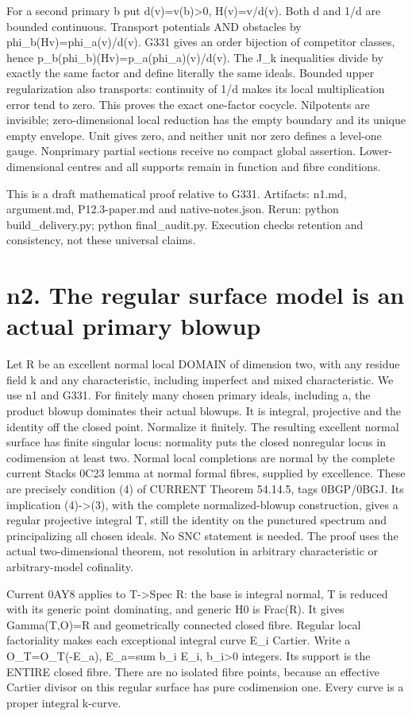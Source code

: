 \documentclass[11pt]{article}
\begin{document}
For a second primary b put d(v)=v(b)>0, H(v)=v/d(v). Both d and 1/d are bounded continuous. Transport potentials AND obstacles by phi\_b(Hv)=phi\_a(v)/d(v). G331 gives an order bijection of competitor classes, hence p\_b(phi\_b)(Hv)=p\_a(phi\_a)(v)/d(v). The J\_k inequalities divide by exactly the same factor and define literally the same ideals. Bounded upper regularization also transports: continuity of 1/d makes its local multiplication error tend to zero. This proves the exact one-factor cocycle. Nilpotents are invisible; zero-dimensional local reduction has the empty boundary and its unique empty envelope. Unit gives zero, and neither unit nor zero defines a level-one gauge. Nonprimary partial sections receive no compact global assertion. Lower-dimensional centres and all supports remain in function and fibre conditions.

This is a draft mathematical proof relative to G331. Artifacts: n1.md, argument.md, P12.3-paper.md and native-notes.json. Rerun: python build\_delivery.py; python final\_audit.py. Execution checks retention and consistency, not these universal claims.


\section*{n2. The regular surface model is an actual primary blowup}

Let R be an excellent normal local DOMAIN of dimension two, with any residue field k and any characteristic, including imperfect and mixed characteristic. We use n1 and G331. For finitely many chosen primary ideals, including a, the product blowup dominates their actual blowups. It is integral, projective and the identity off the closed point. Normalize it finitely. The resulting excellent normal surface has finite singular locus: normality puts the closed nonregular locus in codimension at least two. Normal local completions are normal by the complete current Stacks 0C23 lemma at normal formal fibres, supplied by excellence. These are precisely condition (4) of CURRENT Theorem 54.14.5, tags 0BGP/0BGJ. Its implication (4)->(3), with the complete normalized-blowup construction, gives a regular projective integral T, still the identity on the punctured spectrum and principalizing all chosen ideals. No SNC statement is needed. The proof uses the actual two-dimensional theorem, not resolution in arbitrary characteristic or arbitrary-model cofinality.

Current 0AY8 applies to T->Spec R: the base is integral normal, T is reduced with its generic point dominating, and generic H0 is Frac(R). It gives Gamma(T,O)=R and geometrically connected closed fibre. Regular local factoriality makes each exceptional integral curve E\_i Cartier. Write a O\_T=O\_T(-E\_a), E\_a=sum b\_i E\_i, b\_i>0 integers. Its support is the ENTIRE closed fibre. There are no isolated fibre points, because an effective Cartier divisor on this regular surface has pure codimension one. Every curve is a proper integral k-curve.
\end{document}
